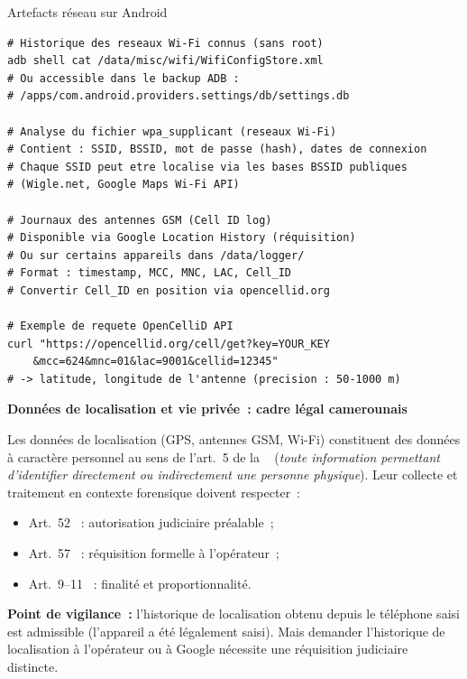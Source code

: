\begin{boxoutils}{Artefacts réseau sur Android}
\begin{lstlisting}[language=bash_forensique]
# Historique des reseaux Wi-Fi connus (sans root)
adb shell cat /data/misc/wifi/WifiConfigStore.xml
# Ou accessible dans le backup ADB :
# /apps/com.android.providers.settings/db/settings.db

# Analyse du fichier wpa_supplicant (reseaux Wi-Fi)
# Contient : SSID, BSSID, mot de passe (hash), dates de connexion
# Chaque SSID peut etre localise via les bases BSSID publiques
# (Wigle.net, Google Maps Wi-Fi API)

# Journaux des antennes GSM (Cell ID log)
# Disponible via Google Location History (réquisition)
# Ou sur certains appareils dans /data/logger/
# Format : timestamp, MCC, MNC, LAC, Cell_ID
# Convertir Cell_ID en position via opencellid.org

# Exemple de requete OpenCelliD API
curl "https://opencellid.org/cell/get?key=YOUR_KEY
    &mcc=624&mnc=01&lac=9001&cellid=12345"
# -> latitude, longitude de l'antenne (precision : 50-1000 m)
\end{lstlisting}
\end{boxoutils}

\begin{boxjuris}
\textbf{Données de localisation et vie privée~: cadre légal camerounais}

Les données de localisation (GPS, antennes GSM, Wi-Fi) constituent des
données à caractère personnel au sens de l'art.~5 de la ~\cite{cameroun2024donnees}
(\textit{toute information permettant d'identifier directement ou
indirectement une personne physique}). Leur collecte et traitement
en contexte forensique doivent respecter~:
\begin{itemize}
    \item Art.~52 ~: autorisation judiciaire préalable~;
    \item Art.~57 ~: réquisition formelle à l'opérateur~;
    \item Art.~9--11 ~: finalité et proportionnalité.
\end{itemize}
\textbf{Point de vigilance~:} l'historique de localisation obtenu depuis
le téléphone saisi est admissible (l'appareil a été légalement saisi).
Mais demander l'historique de localisation à l'opérateur ou à Google
nécessite une réquisition judiciaire distincte.
\end{boxjuris}


